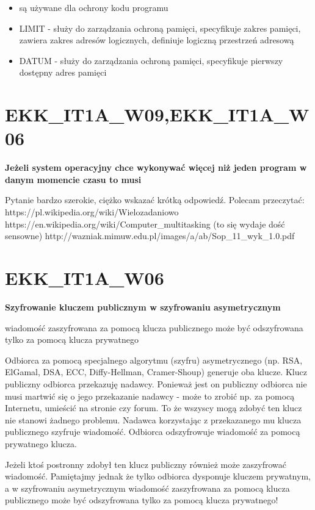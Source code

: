 \vspace{0.4cm}

\begin{itemize}
	\item są używane dla ochrony kodu programu
	\item LIMIT - służy do zarządzania ochroną pamięci, specyfikuje zakres pamięci, zawiera zakres adresów logicznych, definiuje logiczną przestrzeń adresową
	\item DATUM - służy do zarządzania ochroną pamięci, specyfikuje pierwszy dostępny adres pamięci
\end{itemize}


\section{EKK\_IT1A\_W09,EKK\_IT1A\_W06}
\textbf{Jeżeli system operacyjny chce wykonywać więcej niż jeden program w danym momencie czasu to musi}

\vspace{0.4cm}

Pytanie bardzo szerokie, ciężko wskazać krótką odpowiedź. Polecam przeczytać:
https://pl.wikipedia.org/wiki/Wielozadaniowo%
https://en.wikipedia.org/wiki/Computer\_multitasking (to się wydaje dość sensowne)
http://wazniak.mimuw.edu.pl/images/a/ab/Sop\_11\_wyk\_1.0.pdf 


\section{EKK\_IT1A\_W06}
\textbf{Szyfrowanie kluczem publicznym w szyfrowaniu asymetrycznym}

\vspace{0.4cm}
wiadomość zaszyfrowana za pomocą klucza publicznego może być odszyfrowana tylko za pomocą klucza prywatnego

Odbiorca za pomocą specjalnego algorytmu (szyfru) asymetrycznego (np. RSA, ElGamal, DSA, ECC, Diffy-Hellman, Cramer-Shoup) generuje oba klucze. Klucz publiczny odbiorca przekazuję nadawcy. Ponieważ jest on publiczny odbiorca nie musi martwić się o jego przekazanie nadawcy - może to zrobić np. za pomocą Internetu, umieścić na stronie czy forum. To że wszyscy mogą zdobyć ten klucz nie stanowi żadnego problemu.
Nadawca korzystając z przekazanego mu klucza publicznego szyfruje wiadomość.
Odbiorca odszyfrowuje wiadomość za pomocą prywatnego klucza.

Jeżeli ktoś postronny zdobył ten klucz publiczny również może zaszyfrować wiadomość. Pamiętajmy jednak że tylko odbiorca dysponuje kluczem prywatnym, a w szyfrowaniu asymetrycznym wiadomość zaszyfrowana za pomocą klucza publicznego może być odszyfrowana tylko za pomocą klucza prywatnego! 

